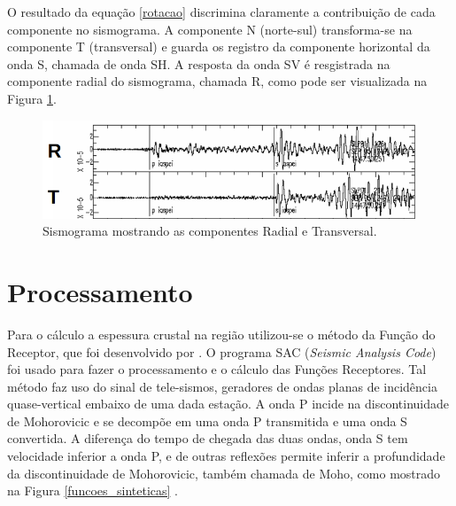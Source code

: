 O resultado da equação \ref{rotacao} discrimina claramente a contribuição de cada componente  no sismograma. A componente N (norte-sul) transforma-se na componente T (transversal) e guarda os registro da componente horizontal da onda S, chamada de onda SH. A resposta da onda SV é resgistrada na componente radial do sismograma, chamada R, como pode ser visualizada na Figura \ref{sismo_radial}.

\begin{figure}[!ht]
\centering
\includegraphics[scale=0.6]{Figs/Componente_Radial_Transversal.png}
\caption{Sismograma mostrando as componentes Radial e Transversal.}
\label{sismo_radial}
\end{figure}

\section{Processamento}

Para o cálculo a espessura crustal na região utilizou-se o método da Função do Receptor, que foi desenvolvido por \cite{Langston_1977}. O programa SAC (\textit{Seismic Analysis Code}) foi usado para fazer o processamento e o cálculo das Funções Receptores. Tal método faz uso do sinal de tele-sismos, geradores de ondas planas de incidência quase-vertical embaixo de uma dada estação. A onda P incide na discontinuidade de Mohorovicic e se decompõe em uma onda P transmitida e uma onda S convertida. A diferença do tempo de chegada das duas ondas, onda S tem velocidade inferior a onda P, e de outras reflexões permite inferir a profundidade da discontinuidade de Mohorovicic, também chamada de Moho, como mostrado na Figura \ref{funcoes_sinteticas} .

